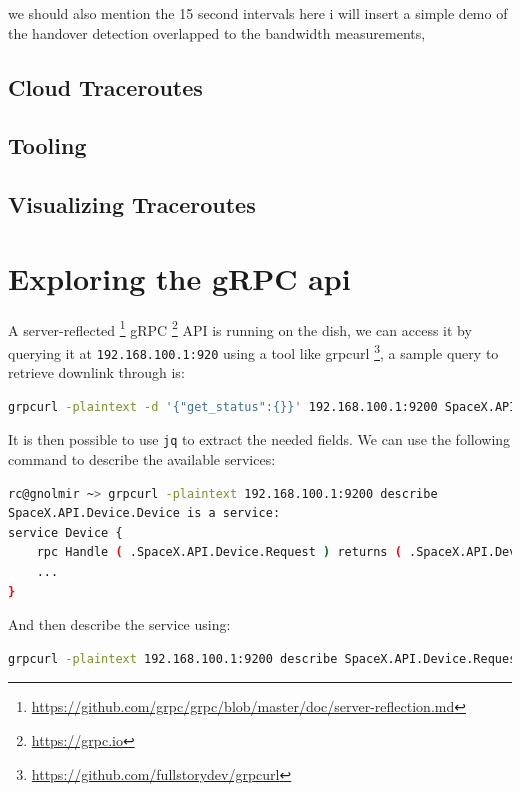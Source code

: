 \documentclass[IN,11pt,twoside,openright,bachelor,english]{tumthesis}
\begin{document}
we should also mention the 15 second intervals
here i will insert a simple demo of the handover detection overlapped to the bandwidth measurements, 

\section{Cloud Traceroutes}
\section{Tooling}
\section{Visualizing Traceroutes}

\chapter{Exploring the gRPC api}

A server-reflected \footnote{\url{https://github.com/grpc/grpc/blob/master/doc/server-reflection.md}} gRPC
\footnote{\url{https://grpc.io}} API is running on the dish, we can access it by querying it at \texttt{192.168.100.1:920} using a tool like grpcurl \footnote{\url{https://github.com/fullstorydev/grpcurl}}, a sample query to retrieve downlink through is:

\begin{lstlisting}[language=bash,basicstyle=\tiny]
grpcurl -plaintext -d '{"get_status":{}}' 192.168.100.1:9200 SpaceX.API.Device.Device/Handle
\end{lstlisting}

It is then possible to use \texttt{jq} to extract the needed fields. We can use the following command to describe the available services:

\begin{lstlisting}[language=bash,basicstyle=\tiny]
rc@gnolmir ~> grpcurl -plaintext 192.168.100.1:9200 describe
SpaceX.API.Device.Device is a service:
service Device {
	rpc Handle ( .SpaceX.API.Device.Request ) returns ( .SpaceX.API.Device.Response );
	...
}
\end{lstlisting}

And then describe the service using:

\begin{lstlisting}[language=bash,basicstyle=\tiny]
grpcurl -plaintext 192.168.100.1:9200 describe SpaceX.API.Device.Request
\end{lstlisting}
\end{document}
